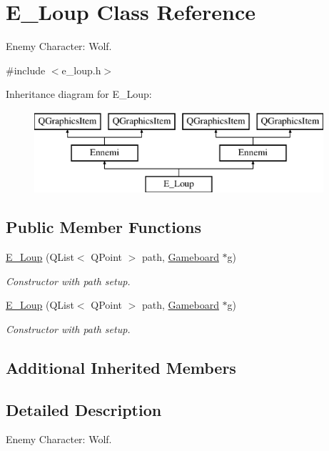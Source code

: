 \hypertarget{class_e___loup}{}\section{E\+\_\+\+Loup Class Reference}
\label{class_e___loup}


Enemy Character\+: Wolf.  




{\ttfamily \#include $<$e\+\_\+loup.\+h$>$}

Inheritance diagram for E\+\_\+\+Loup\+:\begin{figure}[H]
\begin{center}
\leavevmode
\includegraphics[height=3.000000cm]{class_e___loup}
\end{center}
\end{figure}
\subsection*{Public Member Functions}
\begin{DoxyCompactItemize}
\item 
\hyperlink{class_e___loup_a93c72a161ae4093e7bb9ab7d495ca555}{E\+\_\+\+Loup} (Q\+List$<$ Q\+Point $>$ path, \hyperlink{class_gameboard}{Gameboard} $\ast$g)
\begin{DoxyCompactList}\small\item\em Constructor with path setup. \end{DoxyCompactList}\item 
\hyperlink{class_e___loup_a93c72a161ae4093e7bb9ab7d495ca555}{E\+\_\+\+Loup} (Q\+List$<$ Q\+Point $>$ path, \hyperlink{class_gameboard}{Gameboard} $\ast$g)
\begin{DoxyCompactList}\small\item\em Constructor with path setup. \end{DoxyCompactList}\end{DoxyCompactItemize}
\subsection*{Additional Inherited Members}


\subsection{Detailed Description}
Enemy Character\+: Wolf. 

